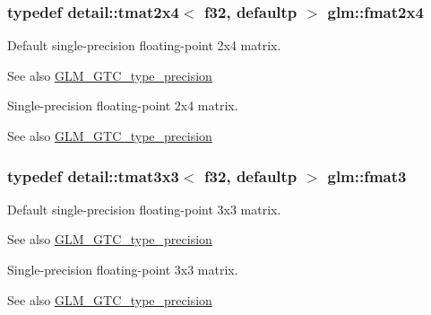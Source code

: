 \subsubsection[{\texorpdfstring{fmat2x4}{fmat2x4}}]{\setlength{\rightskip}{0pt plus 5cm}typedef detail\+::tmat2x4$<$ f32, defaultp $>$ {\bf glm\+::fmat2x4}}\hypertarget{group__gtc__type__precision_gaf3af7a2f10aaf8028a95b7232b24d84e}{}\label{group__gtc__type__precision_gaf3af7a2f10aaf8028a95b7232b24d84e}
Default single-\/precision floating-\/point 2x4 matrix. \begin{DoxySeeAlso}{See also}
\hyperlink{group__gtc__type__precision}{G\+L\+M\+\_\+\+G\+T\+C\+\_\+type\+\_\+precision}
\end{DoxySeeAlso}
Single-\/precision floating-\/point 2x4 matrix. \begin{DoxySeeAlso}{See also}
\hyperlink{group__gtc__type__precision}{G\+L\+M\+\_\+\+G\+T\+C\+\_\+type\+\_\+precision} 
\end{DoxySeeAlso}
\subsubsection[{\texorpdfstring{fmat3}{fmat3}}]{\setlength{\rightskip}{0pt plus 5cm}typedef detail\+::tmat3x3$<$ f32, defaultp $>$ {\bf glm\+::fmat3}}\hypertarget{group__gtc__type__precision_gaa7b09502b183884aca53338c35b09509}{}\label{group__gtc__type__precision_gaa7b09502b183884aca53338c35b09509}
Default single-\/precision floating-\/point 3x3 matrix. \begin{DoxySeeAlso}{See also}
\hyperlink{group__gtc__type__precision}{G\+L\+M\+\_\+\+G\+T\+C\+\_\+type\+\_\+precision}
\end{DoxySeeAlso}
Single-\/precision floating-\/point 3x3 matrix. \begin{DoxySeeAlso}{See also}
\hyperlink{group__gtc__type__precision}{G\+L\+M\+\_\+\+G\+T\+C\+\_\+type\+\_\+precision} 
\end{DoxySeeAlso}
